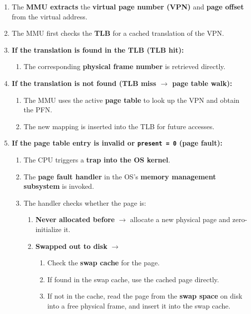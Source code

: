 \documentclass[8pt]{extarticle}
\begin{document}
\begin{minipage}[htp]{0.5\textwidth}
\begin{minipage}[htp]{1\textwidth}
\begin{enumerate}[noitemsep,nolistsep,topsep=-10px,partopsep=0pt,parsep=0pt]
        \item The \textbf{MMU extracts} the \textbf{virtual page number (VPN)} and \textbf{page offset} from the virtual address.
        \item The MMU first checks the \textbf{TLB} for a cached translation of the VPN.
        \item \textbf{If the translation is found in the TLB (TLB hit):}
        \begin{enumerate}[noitemsep,nolistsep,topsep=0pt]
            \item The corresponding \textbf{physical frame number} is retrieved directly.
        \end{enumerate}
\item \textbf{If the translation is not found (TLB miss $\rightarrow$ page table walk):}
    \begin{enumerate}[noitemsep,nolistsep,topsep=0pt]
        \item The MMU uses the active \textbf{page table} to look up the VPN and obtain the PFN.
        \item The new mapping is inserted into the TLB for future accesses.
    \end{enumerate}
    \item \textbf{If the page table entry is invalid or \texttt{present = 0} (page fault):}
    \begin{enumerate}[noitemsep,nolistsep,topsep=0pt]
        \item The CPU triggers a \textbf{trap into the OS kernel}.
        \item The \textbf{page fault handler} in the OS's \textbf{memory management subsystem} is invoked.
        \item The handler checks whether the page is:
        \begin{enumerate}[noitemsep,nolistsep,topsep=0pt]
            \item \textbf{Never allocated before} $\rightarrow$ allocate a new physical page and zero-initialize it.
            \item \textbf{Swapped out to disk} $\rightarrow$
            \begin{enumerate}[noitemsep,nolistsep,topsep=0pt]
                \item Check the \textbf{swap cache} for the page.
                \item If found in the swap cache, use the cached page directly.
                \item If not in the cache, read the page from the \textbf{swap space} on disk into a free physical frame, and insert it into the swap cache.

\end{enumerate}
\end{enumerate}
\end{enumerate}
\end{enumerate}
\end{minipage}
\end{minipage}
\end{document}
